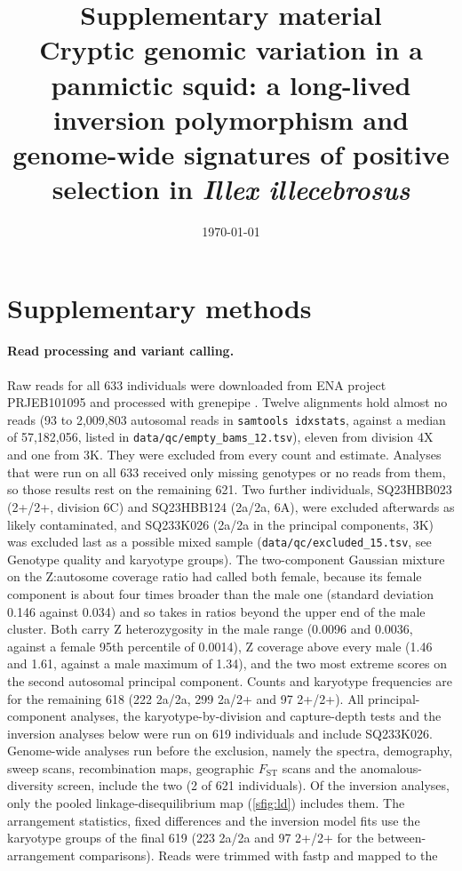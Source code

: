\documentclass[11pt]{article}
\title{\textbf{Supplementary material}\\[2pt]
  Cryptic genomic variation in a panmictic squid: a long-lived inversion polymorphism and genome-wide signatures of positive selection in \textit{Illex illecebrosus}}
\author{}
\date{\today}
\newcommand{\Fst}{F_\mathrm{ST}}
\begin{document}
\maketitle

\section*{Supplementary methods}

\paragraph{Read processing and variant calling.}
Raw reads for all 633 individuals were downloaded from ENA project PRJEB101095 and processed with grenepipe
\citep{czech2022grenepipe}. Twelve alignments hold almost no reads (93 to 2{,}009{,}803 autosomal reads in
\texttt{samtools idxstats}, against a median of 57{,}182{,}056, listed in \texttt{data/qc/empty\_bams\_12.tsv}), eleven
from division 4X and one from 3K. They were excluded from every count and estimate. Analyses that were run on all 633
received only missing genotypes or no reads from them, so those results rest on the remaining 621. Two further individuals, SQ23HBB023 (2+/2+, division 6C) and SQ23HBB124 (2a/2a, 6A), were excluded afterwards as likely contaminated, and SQ233K026 (2a/2a in the principal components, 3K) was excluded last as a possible mixed sample (\texttt{data/qc/excluded\_15.tsv}, see Genotype quality and karyotype groups). The two-component Gaussian mixture on the Z:autosome coverage ratio had called both female, because its female component is about four times broader than the male one (standard deviation 0.146 against 0.034) and so takes in ratios beyond the upper end of the male cluster. Both carry Z heterozygosity in the male range (0.0096 and 0.0036, against a female 95th percentile of 0.0014), Z coverage above every male (1.46 and 1.61, against a male maximum of 1.34), and the two most extreme scores on the second autosomal principal component. Counts and karyotype frequencies are for the remaining 618 (222 2a/2a, 299 2a/2+ and 97 2+/2+). All principal-component analyses, the karyotype-by-division and capture-depth tests and the inversion analyses below were run on 619 individuals and include SQ233K026. Genome-wide analyses run before the exclusion, namely the spectra, demography, sweep scans, recombination maps, geographic $\Fst$ scans and the anomalous-diversity screen, include the two (2 of 621 individuals). Of the inversion analyses, only the pooled linkage-disequilibrium map (\cref{sfig:ld}) includes them. The arrangement statistics, fixed differences and the inversion model fits use the karyotype groups of the final 619 (223 2a/2a and 97 2+/2+ for the between-arrangement comparisons). Reads were trimmed with fastp \citep{chen2018fastp} and mapped to the
\end{document}
